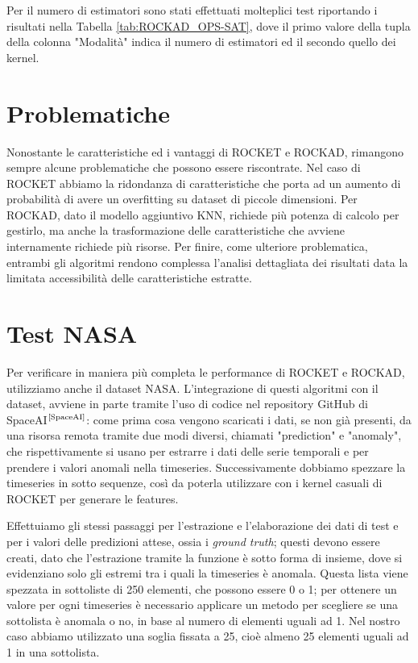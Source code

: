 Per il numero di estimatori sono stati effettuati molteplici test riportando i risultati nella Tabella \ref{tab:ROCKAD_OPS-SAT}, dove il primo valore della tupla della colonna "Modalità" indica il numero di estimatori ed il secondo quello dei kernel.


\pagebreak

\section{Problematiche}
Nonostante le caratteristiche ed i vantaggi di ROCKET e ROCKAD, rimangono sempre alcune problematiche che possono essere riscontrate.
Nel caso di ROCKET abbiamo la ridondanza di caratteristiche che porta ad un aumento di probabilità di avere un overfitting su dataset di piccole dimensioni.
Per ROCKAD, dato il modello aggiuntivo KNN, richiede più potenza di calcolo per gestirlo, ma anche la trasformazione delle caratteristiche che avviene internamente richiede più risorse.
Per finire, come ulteriore problematica, entrambi gli algoritmi rendono complessa l'analisi dettagliata dei risultati data la limitata accessibilità delle caratteristiche estratte.

\pagebreak


\section{Test NASA}
Per verificare in maniera più completa le performance di ROCKET e ROCKAD, utilizziamo anche il dataset NASA.
L'integrazione di questi algoritmi con il dataset, avviene in parte tramite l'uso di codice nel repository GitHub di SpaceAI$^{\text{\cite{SpaceAI}}}$: come prima cosa vengono scaricati i dati, se non già presenti, da una risorsa remota
tramite due modi diversi, chiamati "prediction" e "anomaly", che rispettivamente si usano per estrarre i dati delle serie temporali e per prendere i valori anomali nella timeseries.
Successivamente dobbiamo spezzare la timeseries in sotto sequenze, così da poterla utilizzare con i kernel casuali di ROCKET per generare le features.

Effettuiamo gli stessi passaggi per l'estrazione e l'elaborazione dei dati di test e per i valori delle predizioni attese, ossia i \textit{ground truth}; questi devono essere creati, dato che l'estrazione tramite la funzione è sotto forma di insieme, dove si evidenziano solo gli estremi tra i quali la timeseries è anomala.
Questa lista viene spezzata in sottoliste di 250 elementi, che possono essere 0 o 1; per ottenere un valore per ogni timeseries è necessario applicare un metodo per scegliere se una sottolista è anomala o no, in base al numero di elementi uguali ad 1. 
Nel nostro caso abbiamo utilizzato una soglia fissata a 25, cioè almeno 25 elementi uguali ad 1 in una sottolista.

